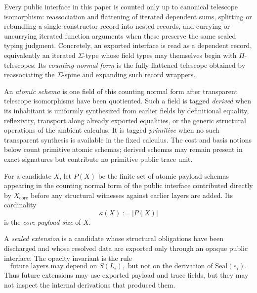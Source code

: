 \begin{definition}
Every public interface in this paper is counted only up to canonical telescope isomorphism:
reassociation and flattening of iterated dependent sums, splitting or rebundling a
single-constructor record into nested records, and currying or uncurrying iterated function
arguments when these preserve the same sealed typing judgment.  Concretely, an exported
interface is read as a dependent record, equivalently an iterated \(\Sigma\)-type whose field
types may themselves begin with \(\Pi\)-telescopes.  Its \emph{counting normal form} is the
fully flattened telescope obtained by reassociating the \(\Sigma\)-spine and expanding such
record wrappers.

An \emph{atomic schema} is one field of this counting normal form after transparent
telescope isomorphisms have been quotiented.  Such a field is tagged \emph{derived} when its
inhabitant is uniformly synthesized from earlier fields by definitional equality, reflexivity,
transport along already exported equalities, or the generic structural operations of the
ambient calculus.  It is tagged \emph{primitive} when no such transparent synthesis is
available in the fixed calculus.  The cost and basis notions below count primitive atomic
schemas; derived schemas may remain present in exact signatures but contribute no
primitive public trace unit.
\end{definition}

\begin{definition}
For a candidate \(X\), let \(P(X)\) be the finite set of atomic payload schemas appearing in
the counting normal form of the public interface contributed directly by
\(X_{\mathrm{core}}\) before any structural witnesses against earlier layers are added.  Its
cardinality
\[
  \kappa(X) := |P(X)|
\]
is the \emph{core payload size} of \(X\).
\end{definition}

\begin{definition}
A \emph{sealed extension} is a candidate whose structural obligations have been discharged
and whose resolved data are exported only through an opaque public interface.  The opacity
invariant is the rule
\[
  \text{future layers may depend on } S(L_i),\text{ but not on the derivation of }\mathrm{Seal}(e_i).
\]
Thus future extensions may use exported payload and trace fields, but they may not inspect
the internal derivations that produced them.
\end{definition}

